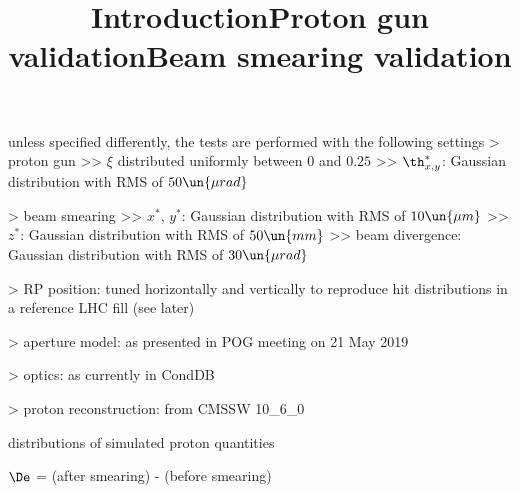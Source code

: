 \def\today{%
	\number\day
	\space
	\ifcase\month\or
	January\or February\or March\or April\or May\or June\or
	July\or August\or September\or October\or November\or December
	\fi
	\space
	\number\year
}

\newpage %

\def\author{J.~Kašpar}
\def\caption{Proton simulation validation, \PeriodLabel}
\def\date{\today}

\iffalse
* single-rp reco

* multi-rp reco
 - resolution
 - impact of misalignment
 - impact of optics systematics
\fi

\newpage %
\title{Introduction}

\> unless specified differently, the tests are performed with the following settings
\>> proton gun
\>>> $\xi$ distributed uniformly between $0$ and $0.25$
\>>> $\th^*_{x, y}$: Gaussian distribution with RMS of $50\un{\mu rad}$

\>> beam smearing
\>>> $x^*$, $y^*$: Gaussian distribution with RMS of $10\un{\mu m}$
\>>> $z^*$: Gaussian distribution with RMS of $50\un{mm}$
\>>> beam divergence: Gaussian distribution with RMS of $30\un{\mu rad}$

\>> RP position: tuned horizontally and vertically to reproduce hit distributions in a reference LHC fill (see later)

\>> aperture model: as presented in POG meeting on 21 May 2019

\>> optics: as currently in CondDB

\>> proton reconstruction: from CMSSW 10\_6\_0


\newpage %
\title{Proton gun validation}

\SmallerFonts

\> distributions of simulated proton quantities

\centerline{}



\newpage %
\title{Beam smearing validation}

\SmallerFonts

\> $\De$ = (after smearing) - (before smearing)


